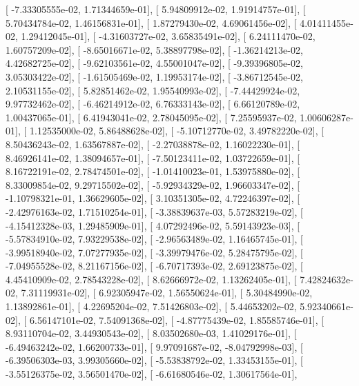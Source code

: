 \documentclass{article}
\begin{document}
       [ -7.33305555e-02,   1.71344659e-01],
       [  5.94809912e-02,   1.91914757e-01],
       [  5.70434784e-02,   1.46156831e-01],
       [  1.87279430e-02,   4.69061456e-02],
       [  4.01411455e-02,   1.29412045e-01],
       [ -4.31603727e-02,   3.65835491e-02],
       [  6.24111470e-02,   1.60757209e-02],
       [ -8.65016671e-02,   5.38897798e-02],
       [ -1.36214213e-02,   4.42682725e-02],
       [ -9.62103561e-02,   4.55001047e-02],
       [ -9.39396805e-02,   3.05303422e-02],
       [ -1.61505469e-02,   1.19953174e-02],
       [ -3.86712545e-02,   2.10531155e-02],
       [  5.82851462e-02,   1.95540993e-02],
       [ -7.44429924e-02,   9.97732462e-02],
       [ -6.46214912e-02,   6.76333143e-02],
       [  6.66120789e-02,   1.00437065e-01],
       [  6.41943041e-02,   2.78045095e-02],
       [  7.25595937e-02,   1.00606287e-01],
       [  1.12535000e-02,   5.86488628e-02],
       [ -5.10712770e-02,   3.49782220e-02],
       [  8.50436243e-02,   1.63567887e-02],
       [ -2.27038878e-02,   1.16022230e-01],
       [  8.46926141e-02,   1.38094657e-01],
       [ -7.50123411e-02,   1.03722659e-01],
       [  8.16722191e-02,   2.78474501e-02],
       [ -1.01410023e-01,   1.53975880e-02],
       [  8.33009854e-02,   9.29715502e-02],
       [ -5.92934329e-02,   1.96603347e-02],
       [ -1.10798321e-01,   1.36629605e-02],
       [  3.10351305e-02,   4.72246397e-02],
       [ -2.42976163e-02,   1.71510254e-01],
       [ -3.38839637e-03,   5.57283219e-02],
       [ -4.15412328e-03,   1.29485909e-01],
       [  4.07292496e-02,   5.59143923e-03],
       [ -5.57834910e-02,   7.93229538e-02],
       [ -2.96563489e-02,   1.16465745e-01],
       [ -3.99518940e-02,   7.07277935e-02],
       [ -3.39979476e-02,   5.28475795e-02],
       [ -7.04955528e-02,   8.21167156e-02],
       [ -6.70717393e-02,   2.69123875e-02],
       [  4.45410909e-02,   2.78543228e-02],
       [  8.62666972e-02,   1.13262405e-01],
       [  7.42824632e-02,   7.31119931e-02],
       [  6.92305947e-02,   1.56550624e-01],
       [  5.30484990e-02,   1.13892861e-01],
       [  4.22695204e-02,   7.51426803e-02],
       [  5.44653202e-02,   5.92340661e-02],
       [  6.56147101e-02,   7.54091368e-02],
       [ -4.87775439e-02,   1.85585746e-01],
       [  8.93110704e-02,   3.44930543e-02],
       [  8.03502680e-03,   1.41029176e-01],
       [ -6.49463242e-02,   1.66200733e-01],
       [  9.97091687e-02,  -8.04792998e-03],
       [ -6.39506303e-03,   3.99305660e-02],
       [ -5.53838792e-02,   1.33453155e-01],
       [ -3.55126375e-02,   3.56501470e-02],
       [ -6.61680546e-02,   1.30617564e-01],
\end{document}
